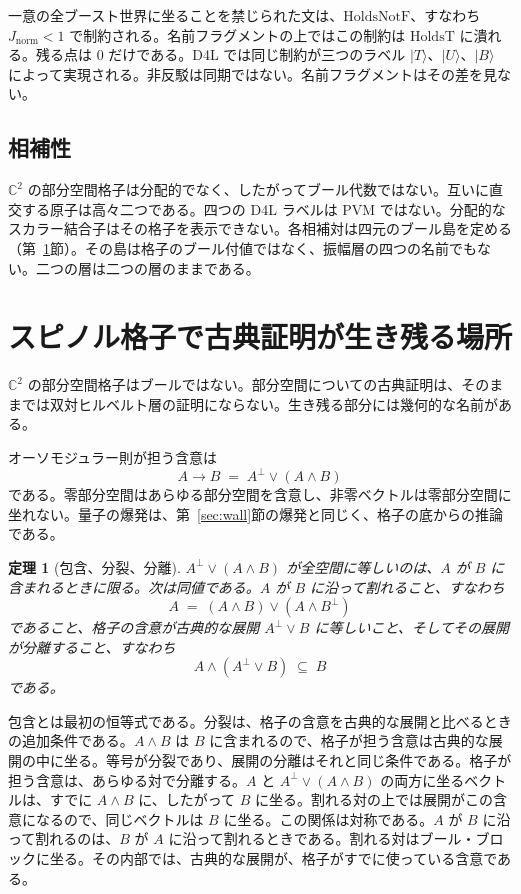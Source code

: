 \documentclass[a4paper]{article}
\newtheorem{theorem}{定理}[section]
\theoremstyle{definition}
\newcommand{\Jnorm}{J_{\mathrm{norm}}}
\begin{document}
一意の全ブースト世界に坐ることを禁じられた文は、\(\mathrm{HoldsNotF}\)、すなわち \(\Jnorm<1\) で制約される。名前フラグメントの上ではこの制約は \(\mathrm{HoldsT}\) に潰れる。残る点は \(0\) だけである。D4L では同じ制約が三つのラベル \(\lvert T\rangle\)、\(\lvert U\rangle\)、\(\lvert B\rangle\) によって実現される。非反駁は同期ではない。名前フラグメントはその差を見ない。

\subsection{相補性}
\label{sec:ex-comp}

\(\mathbb{C}^2\) の部分空間格子は分配的でなく、したがってブール代数ではない。互いに直交する原子は高々二つである。四つの D4L ラベルは PVM ではない。分配的なスカラー結合子はその格子を表示できない。各相補対は四元のブール島を定める（第~\ref{sec:block}節）。その島は格子のブール付値ではなく、振幅層の四つの名前でもない。二つの層は二つの層のままである。

\section{スピノル格子で古典証明が生き残る場所}
\label{sec:block}

\(\mathbb{C}^2\) の部分空間格子はブールではない。部分空間についての古典証明は、そのままでは双対ヒルベルト層の証明にならない。生き残る部分には幾何的な名前がある。

オーソモジュラー則が担う含意は
\[
A\to B \;=\; A^\perp\vee(A\wedge B)
\]
である。零部分空間はあらゆる部分空間を含意し、非零ベクトルは零部分空間に坐れない。量子の爆発は、第~\ref{sec:wall}節の爆発と同じく、格子の底からの推論である。

\begin{theorem}[包含、分裂、分離]
\label{thm:split}
\(A^\perp\vee(A\wedge B)\) が全空間に等しいのは、\(A\) が \(B\) に含まれるときに限る。次は同値である。\(A\) が \(B\) に沿って割れること、すなわち
\[
A \;=\; (A\wedge B)\vee(A\wedge B^\perp)
\]
であること、格子の含意が古典的な展開 \(A^\perp\vee B\) に等しいこと、そしてその展開が分離すること、すなわち
\[
A\wedge(A^\perp\vee B)\;\subseteq\; B
\]
である。
\end{theorem}

包含とは最初の恒等式である。分裂は、格子の含意を古典的な展開と比べるときの追加条件である。\(A\wedge B\) は \(B\) に含まれるので、格子が担う含意は古典的な展開の中に坐る。等号が分裂であり、展開の分離はそれと同じ条件である。格子が担う含意は、あらゆる対で分離する。\(A\) と \(A^\perp\vee(A\wedge B)\) の両方に坐るベクトルは、すでに \(A\wedge B\) に、したがって \(B\) に坐る。割れる対の上では展開がこの含意になるので、同じベクトルは \(B\) に坐る。この関係は対称である。\(A\) が \(B\) に沿って割れるのは、\(B\) が \(A\) に沿って割れるときである。割れる対はブール・ブロックに坐る。その内部では、古典的な展開が、格子がすでに使っている含意である。
\end{document}
